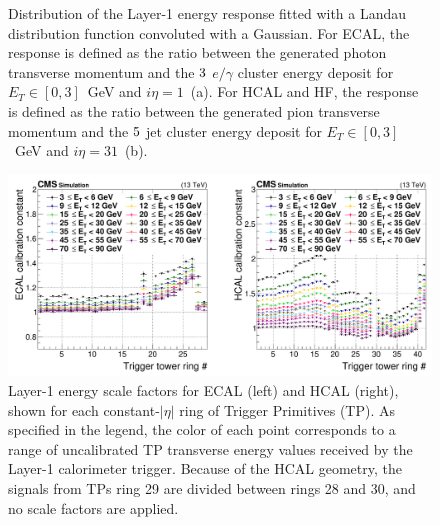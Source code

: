 \begin{figure}
    \centering
    \hspace{0.7cm}
    \caption{Distribution of the Layer-1 energy response fitted with a Landau distribution function convoluted with a Gaussian. For ECAL, the response is defined as the ratio between the generated photon transverse momentum and the $3\time3$ $e/\gamma$ cluster energy deposit for $E_T \in [0,3]$~GeV and $i\eta=1$~(a). For HCAL and HF, the response is defined as the ratio between the generated pion transverse momentum and the $5\time5$ jet cluster energy deposit for $E_T \in [0,3]$~GeV and $i\eta=31$~(b).}
    \label{fig:OldL1Fit}
\end{figure}

\begin{figure}
    \centering
    \includegraphics[width=0.9\linewidth]{Figures/L1TP/L1OldSF.pdf}
    \caption{Layer-1 energy scale factors for ECAL (left) and HCAL (right), shown for each constant-$|\eta|$ ring of Trigger Primitives (TP). As specified in the legend, the color of each point corresponds to a range of uncalibrated TP transverse energy values received by the Layer-1 calorimeter trigger. Because of the HCAL geometry, the signals from TPs ring 29 are divided between rings 28 and 30, and no scale factors are applied.}
    \label{fig:L1OldSF}
\end{figure}

